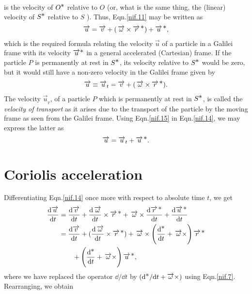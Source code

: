 is the velocity of $O^{\bst}$ relative to $O$ (or, what 
is the same thing, the (linear) velocity of $S ^{\bst}$ 
relative to $S$ ). Thus, Eqn.\eqref{nif.11} may be 
written as
\begin{align}\label{nif.14}
\vec{u} = \vec{v} 
+(\,\vec{\gkw}\times\vec{r}^{\,\bst})+ \svec{u},
\end{align} 
which is the required formula {relating the 
velocity $\vec{u}$ of a particle in a Galilei frame 
with its velocity $\vec{u}^\bst$ in a general 
accelerated (Cartesian) frame}. If the particle $P$ is 
permanently at rest in $S^\bst$, its velocity relative 
to $S^\bst$ would be zero, but it would still have a 
non-zero velocity in the Galilei frame given by
\begin{align}\label{nif.15}
\vec{u} \equiv \vec{u}_t= \vec{v} +
(\,\vec{\gkw}\times\svec{r}) .
\end{align}
The velocity $\vec{u}_{_T}$, of a particle $P$ which is 
permanently at rest in $S^\bst$, is called the 
\textsl{velocity of transport} as it arises due to the 
transport of the particle by the moving frame as seen 
from the Galilei frame. Using Eqn.\eqref{nif.15} in 
Eqn.\eqref{nif.14}, we may express the latter as
\begin{align}\label{nif.14a}
\vec{u} = \vec{u}_t + \svec{u}.
\end{align}
\section{Coriolis acceleration}
Differentiating Eqn.\eqref{nif.14} once more with 
respect  to absolute time $t$, we get
\begin{align}\label{nif.18}
\dv{\vec{u}}{t}&= \dv{\vec{v}}{t} +
\dv{\,\vec{\gkw}}{t}\times\svec{r}
+\,\vec{\gkw}\times\dv{\svec{r}}{t}
+ \dv{\svec{u}}{t}\notag \\
& =\dv{\vec{v}}{t} +(\dv{\,\vec{\gkw}}{t}\times
\vec{r}^{\,\bst } )
+\,\vec{\gkw}\times\left( \dv{^{\bst}}{t}
+\,\vec{\gkw} \times\right) \vec{r}^{\,\bst }\notag\\
& \qquad+\left( \dv{^{\bst}}{t}
+\,\vec{\gkw} \times\right) \svec{u},
\end{align}
where we have replaced the operator $\dd/ \dd t$ by  
$(\dd^{\bst}/\dd t +\vec{\gkw} \times)$ using 
Eqn.\eqref{nif.7}. Rearranging, we obtain

